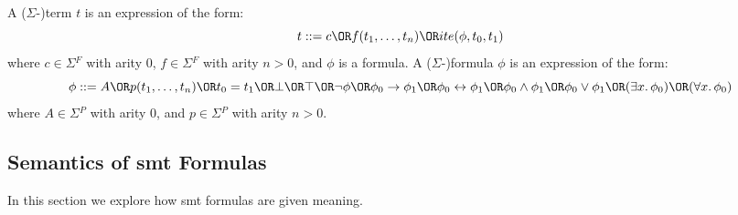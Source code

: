 \begin{definition}\label{def:terms-and-formulas}
  A ($\Sigma{}$-)term $t$ is an expression of the form:
  \[t ::= c \OR f(t_1,\ldots,t_n) \OR ite(\phi{}, t_0, t_1)\]
  where $c \in \Sigma{}^F$ with arity 0, $f \in \Sigma{}^F$ with arity
  $n > 0$, and $\phi{}$ is a formula.
  A ($\Sigma{}$-)formula $\phi{}$ is an expression of the form:
  \[\phi{} ::= A
    \OR p(t_1,\ldots,t_n)
    \OR t_0 = t_1
    \OR \bot{}
    \OR \top{}
    \OR \neg{}\phi{}
    \OR \phi{}_0 \rightarrow{} \phi{}_1
    \OR \phi{}_0 \leftrightarrow{} \phi{}_1
    \OR \phi{}_0 \land{} \phi{}_1
    \OR \phi{}_0 \lor{} \phi{}_1
    \OR (\exists{}x\ldotp\phi{}_0)
    \OR (\forall{}x\ldotp\phi{}_0)
  \]
  where $A \in \Sigma{}^P$ with arity 0, and $p \in \Sigma{}^P$ with arity
  $n > 0$.
\end{definition}





\subsection{Semantics of \gls{smt} Formulas}
\label{sec:smt-semantics}

In this section we explore how \gls{smt} formulas are given meaning.

